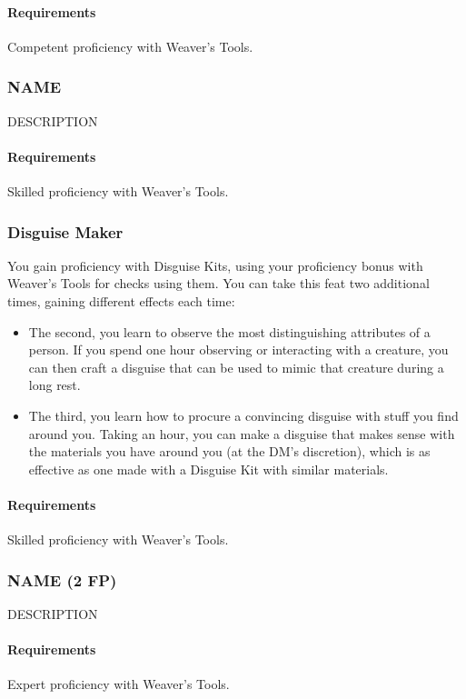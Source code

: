     \paragraph{Requirements} Competent proficiency with Weaver's Tools.
\subsubsection{NAME} \label{feat::name}
    DESCRIPTION
    \paragraph{Requirements} Skilled proficiency with Weaver's Tools.
\subsubsection{Disguise Maker} \label{feat::disguisemaker}
    You gain proficiency with Disguise Kits, using your proficiency bonus with Weaver's Tools for checks using them.
    You can take this feat two additional times, gaining different effects each time:
    \begin{itemize}
        \item The second, you learn to observe the most distinguishing attributes of a person.
        If you spend one hour observing or interacting with a creature, you can then craft a disguise that can be used to mimic that creature during a long rest.
        \item The third, you learn how to procure a convincing disguise with stuff you find around you.
        Taking an hour, you can make a disguise that makes sense with the materials you have around you (at the DM's discretion), which is as effective as one made with a Disguise Kit with similar materials.
    \end{itemize}
    \paragraph{Requirements} Skilled proficiency with Weaver's Tools.
\subsubsection{NAME (2 FP)} \label{feat::name}
    DESCRIPTION
    \paragraph{Requirements} Expert proficiency with Weaver's Tools.


